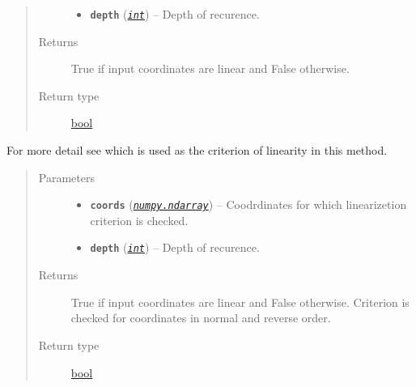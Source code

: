 \documentclass[a4paper,10pt,english]{sphinxmanual}
\begin{document}
\begin{fulllineitems}
\begin{fulllineitems}
\begin{quote}
\begin{description}
\begin{itemize}
\item {} 
\textbf{\texttt{depth}} (\href{https://docs.python.org/2/library/functions.html\#int}{\emph{\texttt{int}}}) -- Depth of recurence.

\end{itemize}

\item[{Returns}] \leavevmode
True if input coordinates are linear and False otherwise.

\item[{Return type}] \leavevmode
\href{https://docs.python.org/2/library/functions.html\#bool}{bool}

\end{description}\end{quote}

\end{fulllineitems}


\begin{fulllineitems}
\label{aqueduct.geom.traces:aqueduct.geom.traces.VectorLinearize.is_linear}
For more detail see {\hyperref[aqueduct.geom.traces:aqueduct.geom.traces.VectorLinearize.is_linear_core]{}} which is used as the criterion of linearity in this method.
\begin{quote}\begin{description}
\item[{Parameters}] \leavevmode\begin{itemize}
\item {} 
\textbf{\texttt{coords}} (\href{http://docs.scipy.org/doc/numpy/reference/generated/numpy.ndarray.html\#numpy.ndarray}{\emph{\texttt{numpy.ndarray}}}) -- Coodrdinates for which linearizetion criterion is checked.

\item {} 
\textbf{\texttt{depth}} (\href{https://docs.python.org/2/library/functions.html\#int}{\emph{\texttt{int}}}) -- Depth of recurence.

\end{itemize}

\item[{Returns}] \leavevmode
True if input coordinates are linear and False otherwise. Criterion is checked for coordinates in normal and reverse order.

\item[{Return type}] \leavevmode
\href{https://docs.python.org/2/library/functions.html\#bool}{bool}

\end{description}\end{quote}

\end{fulllineitems}


\end{fulllineitems}
\end{document}
